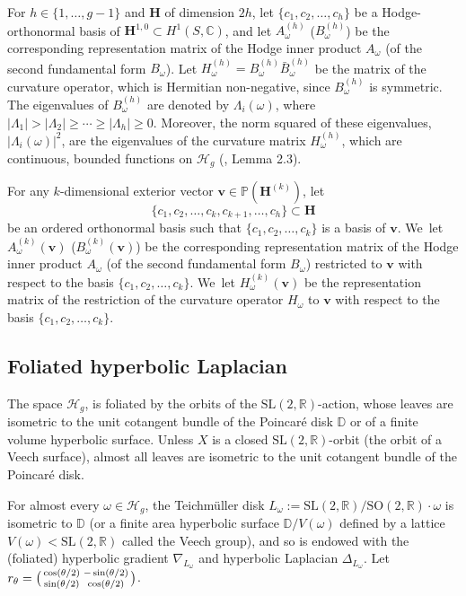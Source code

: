 \documentclass[JEP,XML,SOM,Unicode,published]{cedram}
\newenvironment{smallpmatrix}{\big(\begin{smallmatrix}}{\end{smallmatrix}\big)}
\theoremstyle{plain}
\theoremstyle{definition}
\numberwithin{equation}{subsection}
\newcommand\bC{\mathbb{C}}\let\C\bC
\newcommand\bD{\mathbb{D}}
\newcommand\bP{\mathbb{P}}
\newcommand\bR{\mathbb{R}}\let\R\bR
\newcommand\cH{\mathcal{H}}
\newcommand{\SL}{\mathrm{SL}}
\newcommand{\SO}{\mathrm{SO}}
\let\gradient\nabla
\let\laplacian\Delta
\newcommand{\bfH}{\boldsymbol{H}}
\newcommand{\bfv}{\boldsymbol{v}}
\newcommand{\defeq}{:=}
\newcommand{\Tm}{Teichmüller\xspace}
\begin{document}
For $h\in \{1,\dots, g-1\}$ and $\bfH$ of dimension $2h$, let $\{c_1, c_2,\ldots,c_{h}\}$ be a Hodge-orthonormal basis of $\bfH^{1,0} \subset H^1(S, \bC)$, and let $A^{(h)}_\omega$ (\resp $B^{(h)}_\omega$) be the corresponding representation matrix of the Hodge inner product $A_\omega$ (\resp of the second fundamental form $B_\omega$). Let $H^{(h)}_\omega = B^{(h)}_\omega \bar B^{(h)}_\omega$ be the matrix of the curvature operator, which is Hermitian non-negative, since $B^{(h)}_\omega$ is symmetric. The eigenvalues of $B^{(h)}_\omega$ are denoted by $\Lambda_i(\omega)$, where $ |\Lambda_1| > |\Lambda_2| \geq \cdots \geq |\Lambda_h| \geq 0$. Moreover, the norm squared of these eigenvalues, $|\Lambda_i(\omega)|^ 2$, are the eigenvalues of the curvature matrix $H^{(h)}_\omega$, which are continuous, bounded functions on $\cH_g$ (\cf \cite{FMZ12}, Lemma 2.3).

For any $k$-dimensional exterior vector $\bfv \in \bP(\bfH^{(k)})$, let
\[
\{c_1, c_2,\ldots, c_k, c_{k+1}, \ldots, c_{h}\} \subset
\bfH
\]
be an ordered orthonormal basis such that
$\{c_1, c_2,\ldots, c_k\}$ is a basis of $\bfv$. We~let $A^{(k)}_\omega(\bfv)$ (\resp $B^{(k)}_\omega(\bfv)$) be the corresponding representation matrix of the Hodge inner product $A_\omega$ (\resp of the second fundamental form $B_\omega$)
restricted to $\bfv$ with respect to the basis
$\{c_1, c_2,\ldots, c_k\}$. We~let $H^{(k)}_\omega (\bfv)$
be the representation matrix of the restriction of the curvature operator $H_\omega$ to $\bfv$ with respect to the basis $\{c_1, c_2,\ldots, c_k\}$.

\subsection{Foliated hyperbolic Laplacian}
The space $\cH_g$, is foliated by the orbits of the $\SL(2,\bR)$-action, whose leaves are isometric to the unit cotangent bundle of the Poincaré disk $\bD$ or of a finite volume hyperbolic surface. Unless $X$ is a closed $\SL(2,\R)$-orbit (the orbit of a Veech surface), almost all leaves are isometric to the unit cotangent bundle of the Poincaré disk.

For almost every $\omega \in \cH_g$, the \Tm disk $L_\omega \defeq \SL(2,\bR)/\SO(2,\bR) \cdot \omega$ is isometric to $\bD$ (or a finite area hyperbolic surface $\bD/ V(\omega)$ defined by a lattice $V(\omega)<\SL(2,\R)$ called the Veech group), and so is endowed with the (foliated) hyperbolic gradient $\gradient_{L_\omega}$ and hyperbolic Laplacian $\laplacian_{L_\omega}$. Let $ r_\theta=\begin{smallpmatrix} \cos(\theta/2) &-\sin(\theta/2)\\ \sin(\theta/2)& \cos(\theta/2) \end{smallpmatrix}$.
\end{document}
